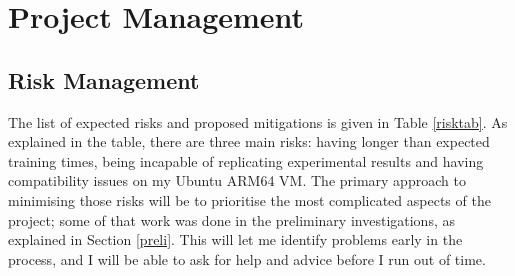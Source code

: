 
\chapter{Project Management} %

\label{Chapter5} %



\section{Risk Management}
\label{risman}

The list of expected risks and proposed mitigations is given in Table \ref{risktab}. As explained in the table, there are three main risks: having longer than expected training times, being incapable of replicating experimental results and having compatibility issues on my Ubuntu ARM64 VM. The primary approach to minimising those risks will be to prioritise the most complicated aspects of the project; some of that work was done in the preliminary investigations, as explained in Section \ref{preli}. This will let me identify problems early in the process, and I will be able to ask for help and advice before I run out of time.

